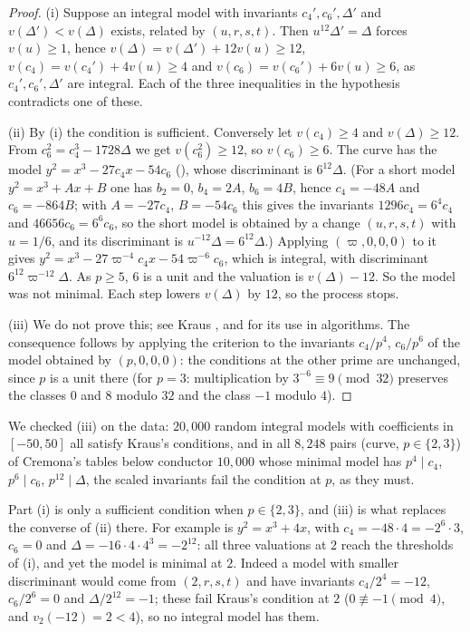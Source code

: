 \begin{proof}
(i) Suppose an integral model with invariants $c_4',c_6',\Delta'$ and $v(\Delta')<v(\Delta)$ exists, related by
$(u,r,s,t)$. Then $u^{12}\Delta'=\Delta$ forces $v(u)\ge1$, hence $v(\Delta)=v(\Delta')+12v(u)\ge12$,
$v(c_4)=v(c_4')+4v(u)\ge4$ and $v(c_6)=v(c_6')+6v(u)\ge6$, as $c_4',c_6',\Delta'$ are integral. Each of the three
inequalities in the hypothesis contradicts one of these.

(ii) By (i) the condition is sufficient. Conversely let $v(c_4)\ge4$ and $v(\Delta)\ge12$. From
$c_6^2=c_4^3-1728\Delta$ we get $v(c_6^2)\ge12$, so $v(c_6)\ge6$. The curve has the model $y^2=x^3-27c_4x-54c_6$
(), whose discriminant is $6^{12}\Delta$. (For a short model $y^2=x^3+Ax+B$ one has $b_2=0$, $b_4=2A$,
$b_6=4B$, hence $c_4=-48A$ and $c_6=-864B$; with $A=-27c_4$, $B=-54c_6$ this gives the invariants $1296c_4=6^4c_4$ and
$46656c_6=6^6c_6$, so the short model is obtained by a change $(u,r,s,t)$ with $u=1/6$, and its discriminant is
$u^{-12}\Delta=6^{12}\Delta$.) Applying $(\varpi,0,0,0)$ to it gives
$y^2=x^3-27\varpi^{-4}c_4x-54\varpi^{-6}c_6$, which is integral, with discriminant $6^{12}\varpi^{-12}\Delta$. As
$p\ge5$, $6$ is a unit and the valuation is $v(\Delta)-12$. So the model was not minimal. Each step lowers
$v(\Delta)$ by $12$, so the process stops.

(iii) We do not prove this; see Kraus \cite{Kraus89}, and \cite[Section 3.2]{Cremona97} for its use in
algorithms. The consequence follows by applying the criterion to the invariants $c_4/p^4$, $c_6/p^6$ of the
model obtained by $(p,0,0,0)$: the conditions at the other prime are unchanged, since $p$ is a unit there
(for $p=3$: multiplication by $3^{-6}\equiv9\pmod{32}$ preserves the classes $0$ and $8$ modulo $32$ and the class $-1$ modulo $4$).
\end{proof}

We checked (iii) on the data: $20{,}000$ random integral models with coefficients in $[-50,50]$ all satisfy
Kraus's conditions, and in all $8{,}248$ pairs (curve, $p\in\{2,3\}$) of Cremona's tables below conductor
$10{,}000$ whose minimal model has $p^4\mid c_4$, $p^6\mid c_6$, $p^{12}\mid\Delta$, the scaled invariants fail
the condition at $p$, as they must.

Part (i) is only a sufficient condition when $p\in\{2,3\}$, and (iii) is what replaces the converse of (ii) there. For
example  is $y^2=x^3+4x$, with $c_4=-48\cdot4=-2^6\cdot3$, $c_6=0$ and $\Delta=-16\cdot4\cdot4^3=-2^{12}$: all three
valuations at $2$ reach the thresholds of (i), and yet the model is minimal at $2$. Indeed a model with smaller
discriminant would come from $(2,r,s,t)$ and have invariants $c_4/2^4=-12$, $c_6/2^6=0$ and $\Delta/2^{12}=-1$; these fail
Kraus's condition at $2$ ($0\not\equiv-1\pmod4$, and $v_2(-12)=2<4$), so no integral model has them.

